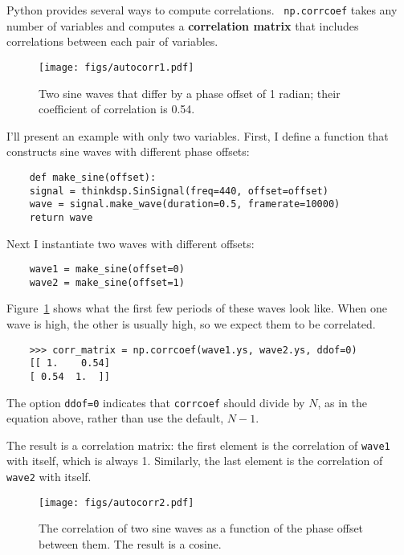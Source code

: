 Python provides several ways to compute correlations.  {\tt
	np.corrcoef} takes any number of variables and computes a {\bf
	correlation matrix} that includes correlations between each pair of
variables.

\begin{figure}
	\centerline{\texttt{[image: figs/autocorr1.pdf]}}
	\caption{Two sine waves that differ by a phase offset of 1 radian;
		their coefficient of correlation is 0.54.}
	\label{fig.autocorr1}
\end{figure}

I'll present an example with only two variables.  First, I define
a function that constructs sine waves with different phase offsets:

\begin{verbatim}
	def make_sine(offset):
	signal = thinkdsp.SinSignal(freq=440, offset=offset)
	wave = signal.make_wave(duration=0.5, framerate=10000)
	return wave
\end{verbatim}

Next I instantiate two waves with different offsets:

\begin{verbatim}
	wave1 = make_sine(offset=0)
	wave2 = make_sine(offset=1)
\end{verbatim}

Figure~\ref{fig.autocorr1} shows what the first few periods of these
waves look like.  When one wave is high, the other is usually high, so we
expect them to be correlated.

\begin{verbatim}
	>>> corr_matrix = np.corrcoef(wave1.ys, wave2.ys, ddof=0)
	[[ 1.    0.54]
	[ 0.54  1.  ]]
\end{verbatim}

The option {\tt ddof=0} indicates that {\tt corrcoef} should divide by
$N$, as in the equation above, rather than use the default, $N-1$.

The result is a correlation matrix:
the first element is the correlation of {\tt wave1}
with itself, which is always 1.  Similarly, the last element
is the correlation of {\tt wave2} with itself.

\begin{figure}
	\centerline{\texttt{[image: figs/autocorr2.pdf]}}
	\caption{The correlation of two sine waves as a function of the
		phase offset between them.  The result is a cosine.}
	\label{fig.autocorr2}
\end{figure}

